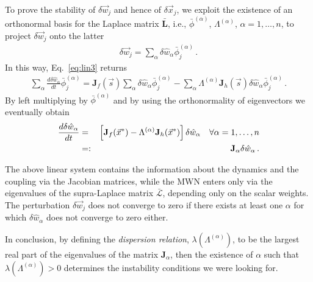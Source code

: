 \documentclass[aps,showpacs,preprintnumbers,amsmath,amssymb,twocolumn,superscriptaddress,floatfix,nofootinbib,10pt,pre]{revtex4-1}
\begin{document}
To prove the stability of $\delta \vec{w}_j$ and hence of $\delta \vec{x}_j$, we exploit the existence of an orthonormal basis for the Laplace matrix $\bar{\mathbf{L}}$, i.e., $\bar{\phi}^{(\alpha)}$, $\Lambda^{(\alpha)}$, $\alpha=1,\dots,n$, to project $\delta \vec{w}_j$ onto the latter
\begin{align}
\delta \vec{w}_j=\sum_\alpha
\delta \hat{w}_\alpha\bar{\phi}^{(\alpha)}_j\, .
\end{align}
In this way, Eq.~\eqref{eq:lin3} returns
\begin{align}
\label{eq:lin4}
\sum_\alpha\frac{d\delta \hat{w}_\alpha}{dt}
\bar{\phi}^{(\alpha)}_j=\mathbf{J}_{f}(\vec{s})\sum_\alpha
\delta \hat{w}_\alpha\bar{\phi}^{(\alpha)}_j- \sum_\alpha \Lambda^{(\alpha)}\mathbf{J}_{h}(\vec{s})
\delta \hat{w}_\alpha\bar{\phi}^{(\alpha)}_j\, .
\end{align}
By left multiplying by $\bar{\phi}^{(\alpha)}$ and by using the orthonormality of eigenvectors we eventually obtain
\begin{eqnarray}
\frac{d\delta \hat{w}_\alpha}{dt}
 &=& \left[\mathbf{J}_{f}(\vec{x}^*)-\Lambda^{(\alpha)}\mathbf{J}_{h}(\vec{x}^*)\right]
\delta \hat{w}_\alpha \quad \forall \alpha=1,\dots,n\notag\\
&=:&\mathbf{J}_{\alpha}\delta \hat{w}_\alpha\, .
\end{eqnarray}

The above linear system contains the information about the dynamics and the coupling via the Jacobian matrices, while the MWN enters only via the eigenvalues of the supra-Laplace matrix $\bar{\mathcal{L}}$, depending only on the scalar weights. The perturbation $\delta \vec{w}_j$ does not converge to zero if there exists at least one $\alpha$ for which $\delta\hat{w}_\alpha$ does not converge to zero either. 

In conclusion, by defining the {\em dispersion relation}, $\lambda(\Lambda^{(\alpha)})$, to be the largest real part of the eigenvalues of the matrix $\mathbf{J}_{\alpha}$, then the existence of $\alpha$ such that $\lambda(\Lambda^{(\alpha)})>0$ determines the instability conditions we were looking for.
\end{document}
